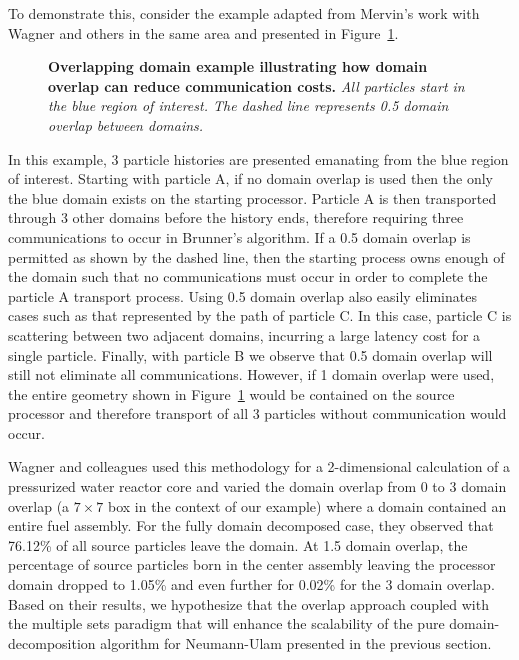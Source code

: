 To demonstrate this, consider the example adapted from Mervin's work
with Wagner and others in the same area \citep{mervin_variance_2012}
and presented in Figure~\ref{fig:msod_example}.
\begin{figure}[t!]
  \begin{center}
    \scalebox{1.5}{
       }
  \end{center}
  \caption{\textbf{Overlapping domain example illustrating how domain
      overlap can reduce communication costs.}
    \textit{All particles start in the blue region of interest. The
      dashed line represents 0.5 domain overlap between domains.}}
  \label{fig:msod_example}
\end{figure}
In this example, 3 particle histories are presented emanating from the
blue region of interest. Starting with particle A, if no domain
overlap is used then the only the blue domain exists on the starting
processor. Particle A is then transported through 3 other domains
before the history ends, therefore requiring three communications to
occur in Brunner's algorithm. If a 0.5 domain overlap is permitted as
shown by the dashed line, then the starting process owns enough of the
domain such that no communications must occur in order to complete the
particle A transport process. Using 0.5 domain overlap also easily
eliminates cases such as that represented by the path of particle
C. In this case, particle C is scattering between two adjacent
domains, incurring a large latency cost for a single
particle. Finally, with particle B we observe that 0.5 domain overlap
will still not eliminate all communications. However, if 1 domain
overlap were used, the entire geometry shown in
Figure~\ref{fig:msod_example} would be contained on the source
processor and therefore transport of all 3 particles without
communication would occur.

Wagner and colleagues used this methodology for a 2-dimensional
calculation of a pressurized water reactor core and varied the domain
overlap from 0 to 3 domain overlap (a $7 \times 7$ box in the context
of our example) where a domain contained an entire fuel assembly. For
the fully domain decomposed case, they observed that 76.12\% of all
source particles leave the domain. At 1.5 domain overlap, the
percentage of source particles born in the center assembly leaving the
processor domain dropped to 1.05\% and even further for 0.02\% for the
3 domain overlap. Based on their results, we hypothesize that the
overlap approach coupled with the multiple sets paradigm that will
enhance the scalability of the pure domain-decomposition algorithm for
Neumann-Ulam presented in the previous section.

